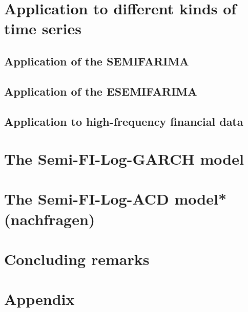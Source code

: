 \documentclass[12pt]{article}
\begin{document}



\section{Application to different kinds of time series}

\subsection{Application of the SEMIFARIMA}

\subsection{Application of the ESEMIFARIMA}

\subsection{Application to high-frequency financial data}

\section{The Semi-FI-Log-GARCH model}

\section{The Semi-FI-Log-ACD model* (nachfragen)}

\section{Concluding remarks}

\printbibliography

\section*{Appendix}
\end{document}

